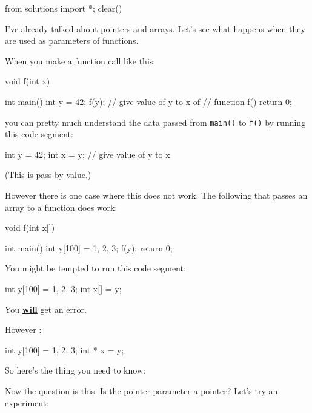 \begin{python0}
from solutions import *; clear()
\end{python0}

I've already talked about pointers and arrays. Let's see what happens
when they are used as parameters of functions.

When you make a function call like this:

\begin{consolethree}[escapeinside=||]
void f(int x)
{}

int main()
{
    int y = 42;
    f(y); // give value of y to x of
          // function f()
    return 0;
}
\end{consolethree}

you can pretty much understand the data passed from \texttt{main()} to
\texttt{f()} by running this code segment:

\begin{consolethree}[escapeinside=||]
int y = 42;
int x = y; // give value of y to x
\end{consolethree}

(This is pass-by-value.)

However there is one case where this does not work. The following that
passes an array to a function does work:

\begin{consolethree}[escapeinside=||]
void f(int x[])
{}

int main()
{
    int y[100] = {1, 2, 3};
    f(y);
    return 0;
}
\end{consolethree}

You might be tempted to run this code segment:

\begin{consolethree}[escapeinside=||]
int y[100] = {1, 2, 3};
int x[] = y;
\end{consolethree}

You \textbf{\underline{will}} get an error.

However :

\begin{consolethree}[escapeinside=||]
int y[100] = {1, 2, 3};
int * x = y;
\end{consolethree}

So here's the thing you need to know:
\begin{center}
\end{center}
Now the question is this: Is the pointer parameter a
 pointer? Let's try an experiment:

